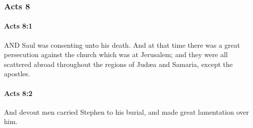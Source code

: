	\subsubsection{Acts 8} %
		\label{ACTS-8}
		
		\paragraph{Acts 8:1} %
			\label{ACTS-8-1}

			AND Saul was consenting unto his death.  And at that time there was a great persecution against the church which was at Jerusalem; and they were all scattered abroad throughout the regions of Judæa and Samaria, except the apostles.

			\begin{framed}
			\scriptsize
				\begin{compactdesc}
					\item[SBLG] 
				\end{compactdesc}
			\end{framed}

		\paragraph{Acts 8:2} %
			\label{ACTS-8-2}

			And devout men carried Stephen to his burial, and made great lamentation over him.

